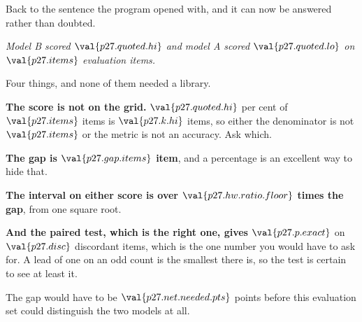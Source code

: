 \begin{fr}
Back to the sentence the program opened with, and it can now be answered
rather than doubted.

\begin{center}
\emph{Model B scored $\val{p27.quoted.hi}$ and model A scored
$\val{p27.quoted.lo}$ on $\val{p27.items}$ evaluation items.}
\end{center}

Four things, and none of them needed a library.

\textbf{The score is not on the grid.} $\val{p27.quoted.hi}$ per cent of
$\val{p27.items}$ items is $\val{p27.k.hi}$ items, so either the denominator
is not $\val{p27.items}$ or the metric is not an accuracy. Ask which.

\textbf{The gap is $\val{p27.gap.items}$ item}, and a percentage is an
excellent way to hide that.

\textbf{The interval on either score is over
$\val{p27.hw.ratio.floor}$ times the gap}, from one square root.

\textbf{And the paired test, which is the right one, gives
$\val{p27.p.exact}$} \dash{} on $\val{p27.disc}$ discordant items, which is
the one number you would have to ask for. A lead of one on an odd count is
the smallest there is, so the test is certain to see at least it.

The gap would have to be $\val{p27.net.needed.pts}$ points before this
evaluation set could distinguish the two models at all.
\end{fr}


